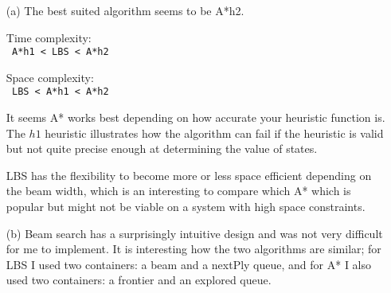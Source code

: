 \documentclass[letterpaper]{article}
\begin{document}
\begin{itemize}
    \item[(a)]
    The best suited algorithm seems to be A*h2.

    Time complexity:\\
    \texttt{ A*h1 < LBS < A*h2 }

    Space complexity:\\
    \texttt{ LBS < A*h1 < A*h2 }

    It seems A* works best depending on how accurate your heuristic function is.
    The $h1$ heuristic illustrates how the algorithm can fail if the heuristic
    is valid but not quite precise enough at determining the value of states.

    LBS has the flexibility to become more or less space efficient depending
    on the beam width, which is an interesting to compare which A* which is
    popular but might not be viable on a system with high space constraints.
    \item[(b)]
    Beam search has a surprisingly intuitive design and was not very difficult
    for me to implement. It is interesting how the two algorithms are similar;
    for LBS I used two containers: a beam and a nextPly queue, and for A* I
    also used two containers: a frontier and an explored queue.
\end{itemize}
\end{document}
